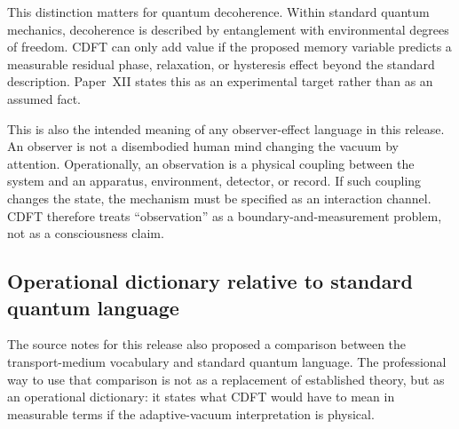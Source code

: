 \documentclass[11pt]{article}
\begin{document}
This distinction matters for quantum decoherence. Within standard quantum
mechanics, decoherence is described by entanglement with environmental degrees of
freedom. CDFT can only add value if the proposed memory variable predicts a
measurable residual phase, relaxation, or hysteresis effect beyond the standard
description. Paper~XII states this as an experimental target rather than as an
assumed fact.

This is also the intended meaning of any observer-effect language in this
release. An observer is not a disembodied human mind changing the vacuum by
attention. Operationally, an observation is a physical coupling between the
system and an apparatus, environment, detector, or record. If such coupling
changes the state, the mechanism must be specified as an interaction channel.
CDFT therefore treats ``observation'' as a boundary-and-measurement problem, not
as a consciousness claim.

\subsection{Operational dictionary relative to standard quantum language}

The source notes for this release also proposed a comparison between the
transport-medium vocabulary and standard quantum language. The professional way
to use that comparison is not as a replacement of established theory, but as an
operational dictionary: it states what CDFT would have to mean in measurable
terms if the adaptive-vacuum interpretation is physical.
\end{document}
